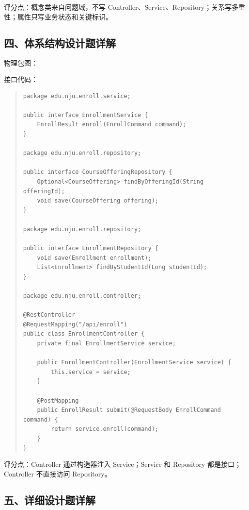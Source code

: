 \documentclass[UTF8,zihao=-4]{ctexart}
\begin{document}
评分点：概念类来自问题域，不写 Controller、Service、Repository；关系写多重性；属性只写业务状态和关键标识。


\subsection{四、体系结构设计题详解}


物理包图：





接口代码：


\begin{quote}
\footnotesize
\begin{verbatim}
package edu.nju.enroll.service;

public interface EnrollmentService {
    EnrollResult enroll(EnrollCommand command);
}

package edu.nju.enroll.repository;

public interface CourseOfferingRepository {
    Optional<CourseOffering> findByOfferingId(String offeringId);
    void save(CourseOffering offering);
}

package edu.nju.enroll.repository;

public interface EnrollmentRepository {
    void save(Enrollment enrollment);
    List<Enrollment> findByStudentId(Long studentId);
}

package edu.nju.enroll.controller;

@RestController
@RequestMapping("/api/enroll")
public class EnrollmentController {
    private final EnrollmentService service;

    public EnrollmentController(EnrollmentService service) {
        this.service = service;
    }

    @PostMapping
    public EnrollResult submit(@RequestBody EnrollCommand command) {
        return service.enroll(command);
    }
}
\end{verbatim}
\end{quote}



评分点：Controller 通过构造器注入 Service；Service 和 Repository 都是接口；Controller 不直接访问 Repository。


\subsection{五、详细设计题详解}
\end{document}
